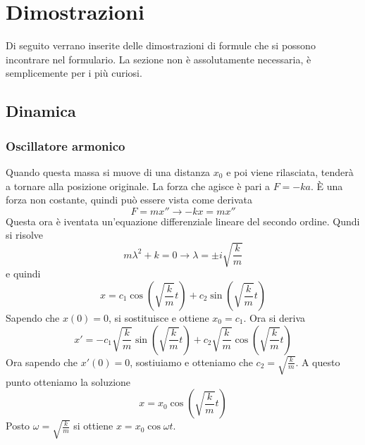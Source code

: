 
\section{Dimostrazioni}
Di seguito verrano inserite delle dimostrazioni di formule che si possono incontrare nel formulario.
La sezione non è assolutamente necessaria, è semplicemente per i più curiosi.

\subsection{Dinamica}
\subsubsection{Oscillatore armonico}
\begin{center}
\end{center}
Quando questa massa si muove di una distanza $x_0$ e poi viene rilasciata, tenderà a tornare alla
posizione originale. La forza che agisce è pari a $F=-ka$. È una forza non costante, quindi
può essere vista come derivata
\begin{equation*}
  F = m x'' \rightarrow -kx = mx''
\end{equation*}
Questa ora è iventata un'equazione differenziale lineare del secondo ordine. Qundi si risolve
\begin{equation*}
  m\lambda^2+k=0 \rightarrow \lambda=\pm i \sqrt{\frac{k}{m}}
\end{equation*}
e quindi
\begin{equation*}
  x=c_1\cos\left(\sqrt{\frac{k}{m}}t\right)+c_2\sin\left(\sqrt{\frac{k}{m}}t\right)
\end{equation*}
Sapendo che $x(0)=0$, si sostituisce e ottiene $x_0=c_1$. Ora si deriva
\begin{equation*}
  x'=-c_1\sqrt{\frac{k}{m}}\sin\left(\sqrt{\frac{k}{m}}t\right)+
  c_2\sqrt{\frac{k}{m}}\cos\left(\sqrt{\frac{k}{m}}t\right)
\end{equation*}
Ora sapendo che $x'(0)=0$, sostiuiamo e otteniamo che $c_2=\sqrt{\frac{k}{m}}$. A questo punto
otteniamo la soluzione
\begin{equation*}
  x=x_0\cos\left(\sqrt{\frac{k}{m}}t\right)
\end{equation*}
Posto $\omega=\sqrt{\frac{k}{m}}$ si ottiene $x=x_0\cos\omega t$.

